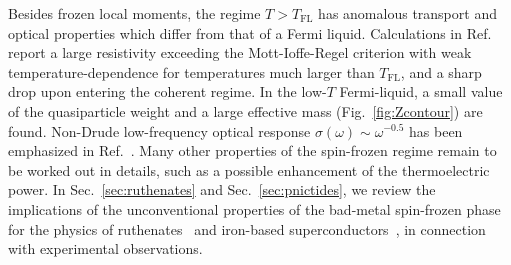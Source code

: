 \documentclass[]{ar2e-changed}%
\def\TFL{T_{\mathrm{FL}}}
\begin{document}
Besides frozen local moments, the regime $T>\TFL$ has anomalous  transport and optical properties 
which differ from that of a Fermi liquid. 
Calculations in Ref.~\cite{haule09} report a large resistivity exceeding the Mott-Ioffe-Regel criterion 
with weak temperature-dependence for temperatures much larger than $\TFL$, 
and a sharp drop upon entering the coherent regime. In the low-$T$ Fermi-liquid, a small value of the quasiparticle weight 
and a large effective mass (Fig.~\ref{fig:Zcontour}) are found. 
%
Non-Drude low-frequency optical response $\sigma(\omega)\sim \omega^{-0.5}$ has been 
emphasized in Ref.~\cite{werner08}. 
%
Many other properties of the spin-frozen regime remain 
to be worked out in details, such as a possible enhancement of the thermoelectric power. 
%
In Sec.~\ref{sec:ruthenates} and Sec.~\ref{sec:pnictides}, we review the implications 
of the unconventional properties of the bad-metal spin-frozen phase for the physics of ruthenates~\cite{werner08} 
and iron-based superconductors~\cite{haule09}, in connection with experimental observations. 
\end{document}
